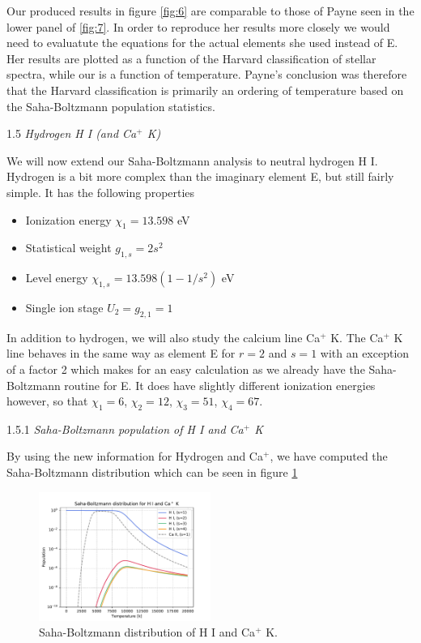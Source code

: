 \documentclass[a4paper,11.5pt,]{article}
\begin{document}
\begin{multicols}{2}
Our produced results in figure \ref{fig:6} are comparable to those of Payne seen in the lower panel of \ref{fig:7}. In order to reproduce her results more closely we would need to evaluatute the equations for the actual elements she used instead of E. Her results are plotted as a function of the Harvard classification of stellar spectra, while our is a function of temperature. Payne's conclusion was therefore that the Harvard classification is primarily an ordering of temperature based on the Saha-Boltzmann population statistics.

\begin{center}
1.5\textit{ Hydrogen H I (and Ca$^+$ K)}
\end{center}
We will now extend our Saha-Boltzmann analysis to neutral hydrogen H I. Hydrogen is a bit more complex than the imaginary element E, but still fairly simple. It has the following properties

\begin{itemize}
    \item Ionization energy $ \chi_1 = 13.598$ eV
    \item Statistical weight $g_{1,s} = 2 s^2$
    \item Level energy $\chi_{1,s} = 13.598(1 - 1/s^2)$ eV
    \item Single ion stage $U_2 = g_{2,1} = 1$
\end{itemize}

\noindent In addition to hydrogen, we will also study the calcium line Ca$^+$ K. The Ca$^+$ K line behaves in the same way as element E for $r=2$ and $s=1$ with an exception of a factor 2 which makes for an easy calculation as we already have the Saha-Boltzmann routine for E. It does have slightly different ionization energies however, so that $\chi_1 = 6$, $\chi_2 = 12$, $\chi_3 = 51$, $\chi_4 = 67$.

\begin{center}
1.5.1\textit{ Saha-Boltzmann population of H I and Ca$^+$ K}
\end{center}

\noindent By using the new information for Hydrogen and Ca$^+$, we have computed the Saha-Boltzmann distribution which can be seen in figure \ref{fig:8}

\begin{figure}[H]
	\centering
	\includegraphics[width=0.5\textwidth]{SSA/figures/sahabolt_HCA.pdf}
	\caption{Saha-Boltzmann distribution of H I and Ca$^+$ K.}
	\label{fig:8}
\end{figure}


\end{multicols}
\end{document}
